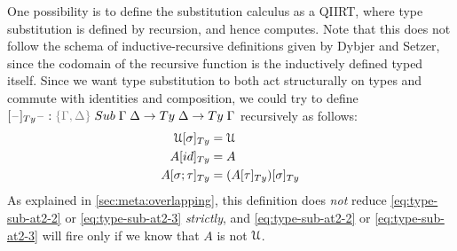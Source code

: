 \documentclass[a4paper,UKenglish,numberwithinsect,cleveref,thm-restate]{lipics-v2021}
\begin{document}
One possibility is to define the substitution calculus as a QIIRT, where type substitution is defined by recursion, and hence computes.
Note that this does not follow the schema of inductive-recursive definitions given by Dybjer and Setzer, since the codomain of the recursive function is the inductively defined typed itself.
Since we want type substitution to both act structurally on types and commute with identities and composition, we could try to define$[\blank]_{\Ty} \blank : \implicit{\Gamma, \Delta} \; \Sub\;\Gamma\;\Delta \to \Ty\;\Delta \to \Ty\;\Gamma$ recursively as follows:
\begin{alignat}{3}
\subTy{\UU}{\sigma}  & = \UU                                   \label{eq:type-sub-at2-1} \\
\subTy{A}{\idS}    & = A                                     \label{eq:type-sub-at2-2} \\
\subTy{A}{\sigma ; \tau}    & = \subTy{(\subTy{A}{\tau})}{\sigma} \label{eq:type-sub-at2-3}
\end{alignat}
As explained in \cref{sec:meta:overlapping}, this definition does \emph{not} reduce \eqref{eq:type-sub-at2-2} or \eqref{eq:type-sub-at2-3} \emph{strictly}, and \eqref{eq:type-sub-at2-2} or \eqref{eq:type-sub-at2-3} will fire only if we know that $A$ is not $\mathcal{U}$.
\end{document}
